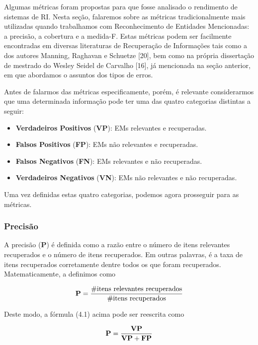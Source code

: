 \documentclass[11pt]{report}
\begin{document}
Algumas métricas foram propostas para que fosse analisado o rendimento de sistemas de RI. Nesta seção, falaremos sobre as métricas tradicionalmente mais utilizadas quando trabalhamos
com Reconhecimento de Entidades Mencionadas: a precisão, a cobertura e a medida-F. Estas métricas podem ser facilmente encontradas em diversas literaturas de
Recuperação de Informações tais como a dos autores Manning, Raghavan e Schuetze [20], bem como na própria dissertação de mestrado do Wesley Seidel de Carvalho [16], já mencionada na seção anterior, em que abordamos o assuntos dos tipos de erros.

Antes de falarmos das métricas especificamente, porém, é relevante considerarmos que uma determinada informação pode ter uma das quatro categorias distintas a seguir:

\begin{itemize}
 \item \textbf{Verdadeiros Positivos} (\textbf{VP}): EMs relevantes e recuperadas.
 \item \textbf{Falsos Positivos} (\textbf{FP}): EMs não relevantes e recuperadas.
 \item \textbf{Falsos Negativos} (\textbf{FN}): EMs relevantes e não recuperadas.
 \item \textbf{Verdadeiros Negativos} (\textbf{VN}): EMs não relevantes e não recuperadas.
\end{itemize}

Uma vez definidas estas quatro categorias, podemos agora prosseguir para as métricas.

\subsubsection{Precisão}

\indent\indent A precisão (\textbf{P}) é definida como a razão entre o número de itens relevantes recuperados e o número de itens recuperados.
Em outras palavras, é a taxa de itens recuperados corretamente dentre todos os que foram recuperados. Matematicamente, a definimos como

\begin{equation}
 \text{\textbf{P}} = \dfrac{\text{\#itens relevantes recuperados}}{\text{\#itens recuperados}}
\end{equation}

Deste modo, a fórmula (4.1) acima pode ser reescrita como

\begin{equation}
 \text{\textbf{P}} = \dfrac{\text{\textbf{VP}}}{\text{\textbf{VP}} + \text{\textbf{FP}}}
\end{equation}
\end{document}
